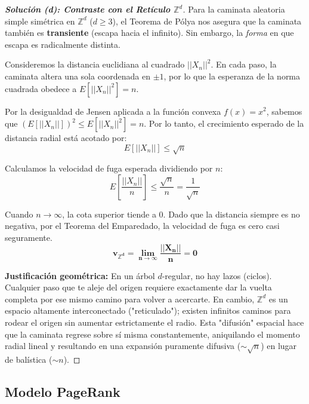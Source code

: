 \documentclass[10pt,a4paper]{article}
\begin{document}
\begin{proof}[\textbf{Solución (d): Contraste con el Retículo $\mathbb{Z}^d$}]
    Para la caminata aleatoria simple simétrica en $\mathbb{Z}^d$ ($d \ge 3$), el Teorema de Pólya nos asegura que la caminata también es \textbf{transiente} (escapa hacia el infinito). Sin embargo, la \textit{forma} en que escapa es radicalmente distinta.
    
    Consideremos la distancia euclidiana al cuadrado $||X_n||^2$. En cada paso, la caminata altera una sola coordenada en $\pm 1$, por lo que la esperanza de la norma cuadrada obedece a $E[||X_n||^2] = n$.
    
    Por la desigualdad de Jensen aplicada a la función convexa $f(x) = x^2$, sabemos que $(E[||X_n||])^2 \le E[||X_n||^2] = n$. Por lo tanto, el crecimiento esperado de la distancia radial está acotado por:
    \[ E[||X_n||] \le \sqrt{n} \]
    
    Calculamos la velocidad de fuga esperada dividiendo por $n$:
    \[ E\left[\frac{||X_n||}{n}\right] \le \frac{\sqrt{n}}{n} = \frac{1}{\sqrt{n}} \]
    
    Cuando $n \to \infty$, la cota superior tiende a $0$. Dado que la distancia siempre es no negativa, por el Teorema del Emparedado, la velocidad de fuga es cero casi seguramente.
    \[ \mathbf{v_{\mathbb{Z}^d} = \lim_{n \to \infty} \frac{||X_n||}{n} = 0} \]
    
    \textbf{Justificación geométrica:} En un árbol $d$-regular, no hay lazos (ciclos). Cualquier paso que te aleje del origen requiere exactamente dar la vuelta completa por ese mismo camino para volver a acercarte. En cambio, $\mathbb{Z}^d$ es un espacio altamente interconectado ("reticulado"); existen infinitos caminos para rodear el origen sin aumentar estrictamente el radio. Esta "difusión" espacial hace que la caminata regrese sobre sí misma constantemente, aniquilando el momento radial lineal y resultando en una expansión puramente difusiva ($\sim \sqrt{n}$) en lugar de balística ($\sim n$).
\end{proof}


\newpage


\subsection{Modelo PageRank}
\end{document}
